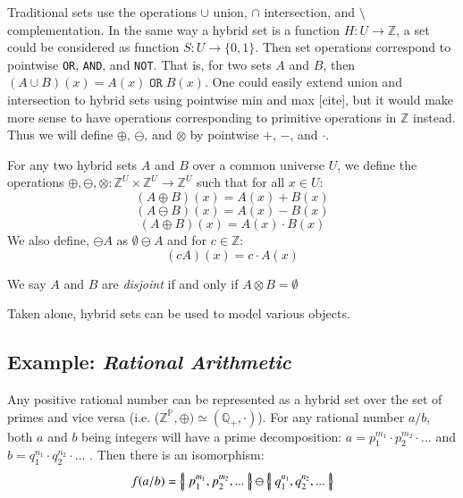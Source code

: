 Traditional sets use the operations $\cup$ union, $\cap$ intersection, and $\setminus$ complementation.
In the same way a hybrid set is a function $H : U \to \mathbb{Z}$, a set could be considered as function $S : U \to \{ 0,1 \}$.
Then set operations correspond to pointwise \texttt{OR}, \texttt{AND}, and \texttt{NOT}.
That is, for two sets $A$ and $B$, then $(A \cup B)(x) = A(x) \;\mathtt{OR}\; B(x)$.
One could easily extend union and intersection to hybrid sets using pointwise min and max
[cite],
but it would make more sense to have operations corresponding to primitive operations in $\mathbb{Z}$ instead.
Thus we will define $\oplus$, $\ominus$, and $\otimes$ by pointwise $+$, $-$, and $\cdot$.

\begin{definition}
For any two hybrid sets $A$ and $B$ over a common universe $U$, we define the operations $\oplus, \ominus, \otimes : \mathbb{Z}^U \times \mathbb{Z}^U \to \mathbb{Z}^U$ such that for all $x \in U$:
\begin{equation}
(A \oplus B)(x) = A(x) + B(x)
\end{equation}
\begin{equation}
(A \ominus B)(x) = A(x) - B(x)
\end{equation}
\begin{equation}
(A \oplus B)(x) = A(x) \cdot B(x)
\end{equation}
We also define, $\ominus A$ as $\emptyset \ominus A$ and for $c \in \mathbb{Z}$:
\begin{equation}
(cA)(x) = c \cdot A(x)
\end{equation}
\end{definition}

\begin{definition}
We say $A$ and $B$ are \emph{disjoint} if and only if $A \otimes B = \emptyset$
\end{definition}

Taken alone, hybrid sets can be used to model various objects. 

\subsection{Example: \emph{Rational Arithmetic}}
Any positive rational number can be represented as a hybrid set over the set of primes and vice versa  
(i.e. ($\mathbb{Z}^\mathbb{P}, \oplus) \simeq (\mathbb{Q}_+,\cdot)$).
For any rational number $a/b$, both $a$ and $b$ being integers will have a prime decomposition: $a=p_1^{m_1}\cdot p_2^{m_2} \cdot ...$ and $b=q_1^{n_1} \cdot q_2^{n_2} \cdot ...$ . 
Then there is an isomorphism:
\begin{equation}
f(a/b) = \left\{ \! \left| \; p_1^{m_1}, p_2^{m_2}, ... \; \right| \! \right\} \ominus \left\{ \! \left| \; q_1^{n_1}, q_2^{n_2}, ... \; \right| \! \right\}
\end{equation}

